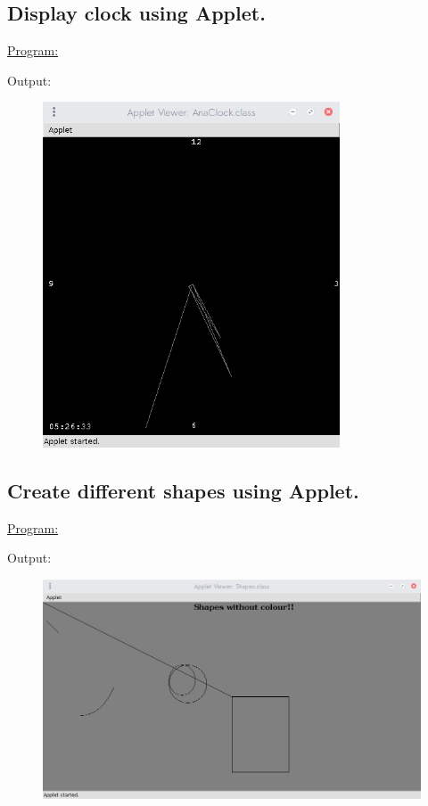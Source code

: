 \documentclass[a4paper,11pt]{article}
\begin{document}
\bigskip

\subsection{Display clock using Applet.}
\underline{Program:}


Output:
\begin{figure}[H]
\centering
\includegraphics[width=250pt,height=\textheight,keepaspectratio]{../assign2/pics/2.png}
\end{figure}

\bigskip

\subsection{Create different shapes using Applet.}
\underline{Program:}


Output:
\begin{figure}[H]
\centering
\includegraphics[width=350pt,height=\textheight,keepaspectratio]{../assign2/pics/3.png}
\end{figure}
\end{document}
